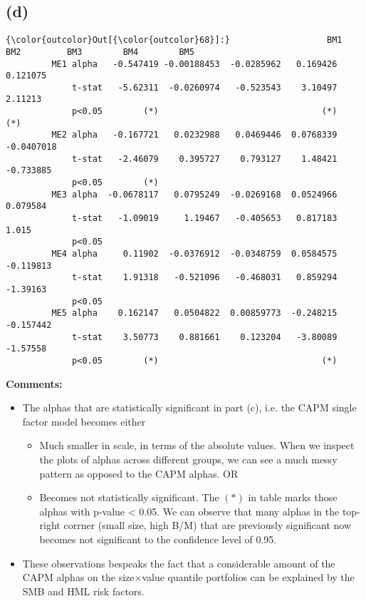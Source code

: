 \documentclass[10pt]{article}
\begin{document}
    \begin{center}
    \end{center}

    
    \subsection{(d)}\label{d}


            \begin{Verbatim}[commandchars=\\\{\}]
{\color{outcolor}Out[{\color{outcolor}68}]:}                   BM1         BM2         BM3        BM4        BM5
         ME1 alpha   -0.547419 -0.00188453  -0.0285962   0.169426   0.121075
             t-stat   -5.62311  -0.0260974   -0.523543    3.10497    2.11213
             p<0.05        (*)                                (*)        (*)
         ME2 alpha   -0.167721   0.0232988   0.0469446  0.0768339 -0.0407018
             t-stat   -2.46079    0.395727    0.793127    1.48421  -0.733885
             p<0.05        (*)                                              
         ME3 alpha  -0.0678117   0.0795249  -0.0269168  0.0524966   0.079584
             t-stat   -1.09019     1.19467   -0.405653   0.817183      1.015
             p<0.05                                                         
         ME4 alpha     0.11902  -0.0376912  -0.0348759  0.0584575  -0.119813
             t-stat    1.91318   -0.521096   -0.468031   0.859294   -1.39163
             p<0.05                                                         
         ME5 alpha    0.162147   0.0504822  0.00859773  -0.248215  -0.157442
             t-stat    3.50773    0.881661    0.123204   -3.80089   -1.57558
             p<0.05        (*)                                (*)           
\end{Verbatim}
\textbf{Comments:}
\begin{itemize}
    \item The alphas that are statistically significant in part (c), i.e. the CAPM single factor model becomes either
    \begin{itemize}
        \item Much smaller in scale, in terms of the absolute values. When we inspect the plots of alphas across different groups, we can see a much messy pattern as opposed to the CAPM alphas. OR
        \item Becomes not statistically significant. The $(*)$ in table marks those alphas with p-value < 0.05. We can observe that many alphas in the top-right corrner (small size, high B/M) that are previously significant now becomes not significant to the confidence level of 0.95.
    \end{itemize}
    \item These observations bespeaks the fact that a considerable amount of the CAPM alphas on the size$\times$value quantile portfolios can be explained by the SMB and HML risk factors.
\end{itemize}
        
\end{document}
